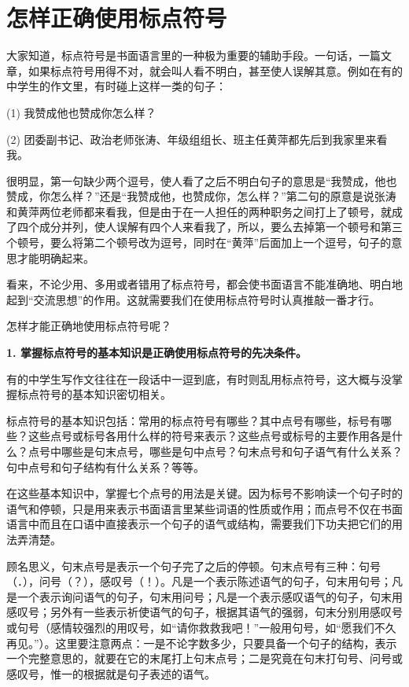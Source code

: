 
\section{怎样正确使用标点符号}

大家知道，标点符号是书面语言里的一种极为重要的辅助手段。一句话，一篇文章，如果标点符号用得不对，就会叫人看不明白，甚至使人误解其意。例如在有的中学生的作文里，有时碰上这样一类的句子：

(1) 我赞成他也赞成你怎么样？

(2) 团委副书记、政治老师张涛、年级组组长、班主任黄萍都先后到我家里来看我。

很明显，第一句缺少两个逗号，使人看了之后不明白句子的意思是“我赞成，他也赞成，你怎么样？”还是“我赞成他，也赞成你，怎么样？”第二句的原意是说张涛和黄萍两位老师都来看我，但是由于在一人担任的两种职务之间打上了顿号，就成了四个成分并列，使人误解有四个人来看我了，所以，要么去掉第一个顿号和第三个顿号，要么将第二个顿号改为逗号，同时在“黄萍”后面加上一个逗号，句子的意思才能明确起来。

看来，不论少用、多用或者错用了标点符号，都会使书面语言不能准确地、明白地起到“交流思想”的作用。这就需要我们在使用标点符号时认真推敲一番才行。

怎样才能正确地使用标点符号呢？

\textbf{1. 掌握标点符号的基本知识是正确使用标点符号的先决条件。}

有的中学生写作文往往在一段话中一逗到底，有时则乱用标点符号，这大概与没掌握标点符号的基本知识密切相关。

标点符号的基本知识包括：常用的标点符号有哪些？其中点号有哪些，标号有哪些？这些点号或标号各用什么样的符号来表示？这些点号或标号的主要作用各是什么？点号中哪些是句末点号，哪些是句中点号？句末点号和句子语气有什么关系？句中点号和句子结构有什么关系？等等。

在这些基本知识中，掌握七个点号的用法是关键。因为标号不影响读一个句子时的语气和停顿，只是用来表示书面语言里某些词语的性质或作用；而点号不仅在书面语言中而且在口语中直接表示一个句子的语气或结构，需要我们下功夫把它们的用法弄清楚。

顾名思义，句末点号是表示一个句子完了之后的停顿。句末点号有三种：句号（．），问号（？），感叹号（！）。凡是一个表示陈述语气的句子，句末用句号；凡是一个表示询问语气的句子，句末用问号；凡是一个表示感叹语气的句子，句末用感叹号；另外有一些表示祈使语气的句子，根据其语气的强弱，句末分别用感叹号或句号（感情较强烈的用叹号，如“请你救救我吧！”一般用句号，如“愿我们不久再见。”）。这里要注意两点：一是不论字数多少，只要具备一个句子的结构，表示一个完整意思的，就要在它的末尾打上句末点号；二是究竟在句末打句号、问号或感叹号，惟一的根据就是句子表述的语气。

